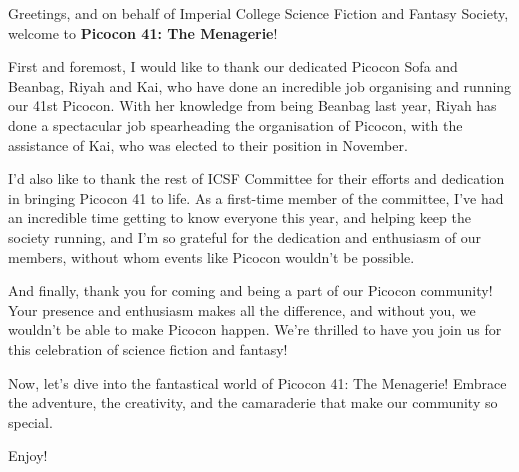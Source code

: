 Greetings, and on behalf of Imperial College Science Fiction and Fantasy Society, welcome to \textbf{Picocon 41: The Menagerie}!

First and foremost, I would like to thank our dedicated Picocon Sofa and Beanbag, Riyah and Kai, who have done an incredible job organising and running our 41st Picocon. With her knowledge from being Beanbag last year, Riyah has done a spectacular job spearheading the organisation of Picocon, with the assistance of Kai, who was elected to their position in November.

I’d also like to thank the rest of ICSF Committee for their efforts and dedication in bringing Picocon 41 to life. As a first-time member of  the committee, I’ve had an incredible time getting to know everyone this year, and helping keep the society running, and I’m so grateful for the dedication and enthusiasm of our members, without whom events like Picocon wouldn't be possible.

And finally, thank you for coming and being a part of our Picocon community! Your presence and enthusiasm makes all the difference, and without you, we wouldn’t be able to make Picocon happen. We’re thrilled to have you join us for this celebration of science fiction and fantasy!

Now, let's dive into the fantastical world of Picocon 41: The Menagerie! Embrace the adventure, the creativity, and the camaraderie that make our community so special.

Enjoy!
